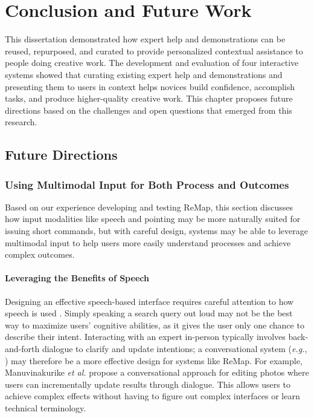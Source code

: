 \chapter{Conclusion and Future Work}
\label{chapter:discussion}
This dissertation demonstrated how expert help and demonstrations can be reused, repurposed, and curated to provide personalized contextual assistance to people doing creative work. The development and evaluation of four interactive systems showed that curating existing expert help and demonstrations and presenting them to users in context helps novices build confidence, accomplish tasks, and produce higher-quality creative work. This chapter proposes future directions based on the challenges and open questions that emerged from this research.

\section{Future Directions}
\subsection{Using Multimodal Input for Both Process and Outcomes}
Based on our experience developing and testing ReMap, this section discusses how input modalities like speech and pointing may be more naturally suited for issuing short commands, but with careful design, systems may be able to leverage multimodal input to help users more easily understand processes and achieve complex outcomes.

\subsubsection{Leveraging the Benefits of Speech}
Designing an effective speech-based interface requires careful attention to how speech is used \cite{Hugunin1997}. Simply speaking a search query out loud may not be the best way to maximize users' cognitive abilities, as it gives the user only one chance to describe their intent. Interacting with an expert in-person typically involves back-and-forth dialogue to clarify and update intentions; a conversational system (\textit{e.g.}, \cite{Hugunin1997, Manuvinakurike2018}) may therefore be a more effective design for systems like ReMap. For example, Manuvinakurike \textit{et al.} \cite{Manuvinakurike2018} propose a conversational approach for editing photos where users can incrementally update results through dialogue. This allows users to achieve complex effects without having to figure out complex interfaces or learn technical terminology.

